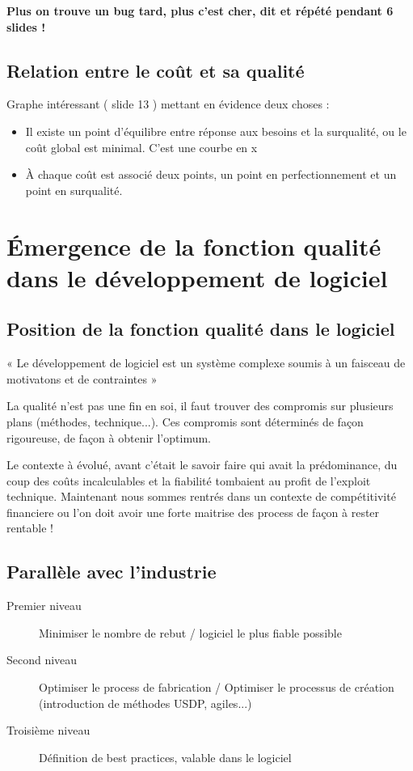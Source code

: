 \textbf{Plus on trouve un bug  tard, plus c'est cher, dit et répété pendant 6 slides !}

	\subsection{Relation entre le coût et sa qualité}

	Graphe intéressant ( slide 13 ) mettant en évidence deux choses :

	\begin{itemize}
    \item Il existe un point d'équilibre entre réponse aux besoins et la surqualité, ou le coût global est minimal. C’est une courbe en x
    \item À chaque coût est associé deux points, un point en perfectionnement et un point en surqualité.
	\end{itemize}



\section{Émergence de la fonction qualité dans le développement de logiciel}

	\subsection{Position de la fonction qualité dans le logiciel}

    « Le développement de logiciel est un système complexe soumis à un faisceau de motivatons et de contraintes »

La qualité n’est pas une fin en soi, il faut trouver des compromis sur plusieurs plans (méthodes, technique...). Ces compromis sont déterminés de façon rigoureuse, de façon à obtenir l’optimum.

Le contexte à évolué, avant c’était le savoir faire qui avait la prédominance, du coup des coûts incalculables et la fiabilité tombaient au profit de l’exploit technique. Maintenant nous sommes rentrés dans un contexte de compétitivité financiere ou l'on doit avoir une forte maitrise des process de façon à rester rentable !

	\subsection{Parallèle avec l’industrie}
	
	\begin{description}
	\item[Premier niveau] Minimiser le nombre de rebut  / logiciel le plus fiable possible
	\item[Second niveau] Optimiser le process de fabrication  / Optimiser le processus de création (introduction de méthodes USDP, agiles...)
	\item[Troisième niveau]Définition de best practices, valable dans le logiciel
	\end{description}


